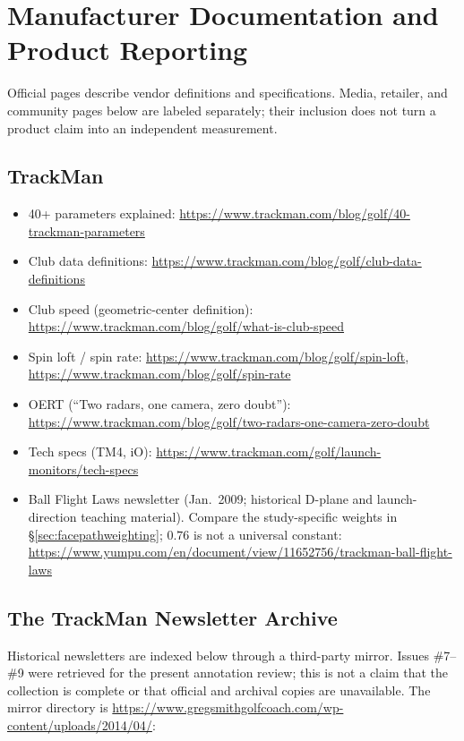 \section{Manufacturer Documentation and Product Reporting}
Official pages describe vendor definitions and specifications. Media,
retailer, and community pages below are labeled separately; their inclusion
does not turn a product claim into an independent measurement.

\subsection*{TrackMan}
\begin{itemize}\small
\item 40+ parameters explained:
  \url{https://www.trackman.com/blog/golf/40-trackman-parameters}
\item Club data definitions:
  \url{https://www.trackman.com/blog/golf/club-data-definitions}
\item Club speed (geometric-center definition):
  \url{https://www.trackman.com/blog/golf/what-is-club-speed}
\item Spin loft / spin rate:
  \url{https://www.trackman.com/blog/golf/spin-loft},
  \url{https://www.trackman.com/blog/golf/spin-rate}
\item OERT (``Two radars, one camera, zero doubt''):
  \url{https://www.trackman.com/blog/golf/two-radars-one-camera-zero-doubt}
\item Tech specs (TM4, iO):
  \url{https://www.trackman.com/golf/launch-monitors/tech-specs}
\item Ball Flight Laws newsletter (Jan.\ 2009; historical D-plane and
  launch-direction teaching material). Compare the study-specific weights
  in \S\ref{sec:facepathweighting}; $0.76$ is not a universal constant:
  \url{https://www.yumpu.com/en/document/view/11652756/trackman-ball-flight-laws}
\end{itemize}

\subsection{The TrackMan Newsletter Archive}

Historical newsletters are indexed below through a third-party mirror.
Issues \#7--\#9 were retrieved for the present annotation review; this is
not a claim that the collection is complete or that official and archival
copies are unavailable. The mirror directory is
\url{https://www.gregsmithgolfcoach.com/wp-content/uploads/2014/04/}:

